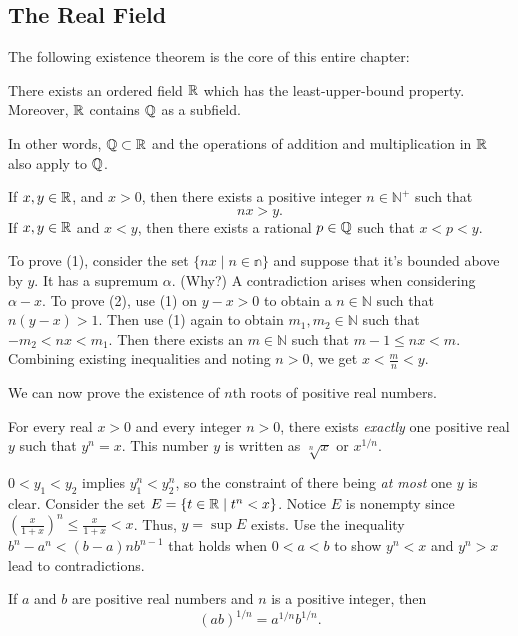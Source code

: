 \documentclass{article}
\begin{document}
\subsection{The Real Field}
The following existence theorem is the core of this entire chapter:
\begin{theorem}
    There exists an ordered field $\mathbb R$ which has the least-upper-bound property. Moreover, $\mathbb R$ contains $\mathbb Q$ as a subfield.
\end{theorem}
In other words, $\mathbb Q\subset \mathbb R$ and the operations of addition and multiplication in $\mathbb R$ also apply to $\mathbb Q$.
\begin{theorem}
    \listhack 
    \begin{enumerate}
        \ii If $x,y\in \mathbb R$, and $x>0$, then there exists a positive integer $n\in\mathbb{N}^{+}$ such that \[nx>y.\]
        \ii If $x,y\in\mathbb R$ and $x<y$, then there exists a rational $p\in\mathbb Q$ such that $x<p<y$.
    \end{enumerate}
\end{theorem}
\begin{remark}
    To prove (1), consider the set $\{nx\mid n\in\mathbb{n}\}$ and suppose that it's bounded above by $y$. It has a supremum $\alpha$. (Why?) A contradiction arises when considering $\alpha-x$. To prove (2), use (1) on $y-x>0$ to obtain a $n\in\mathbb{N}$ such that $n(y-x)>1$. Then use (1) again to obtain $m_{1},m_{2}\in\mathbb{N}$ such that $-m_{2}<nx<m_{1}$. Then there exists an $m\in\mathbb{N}$ such that $m-1\leq nx<m$. Combining existing inequalities and noting $n>0$, we get $x<\frac{m}{n}<y$.
\end{remark}
We can now prove the existence of $n$th roots of positive real numbers. 
\begin{theorem}
    For every real $x>0$ and every integer $n>0$, there exists \emph{exactly} one positive real $y$ such that $y^{n}=x$. This number $y$ is written as $\sqrt[n]{x}$ or $x^{1/n}$. 
\end{theorem}
\begin{remark}
    $0<y_{1}<y_{2}$ implies $y_{1}^{n}<y_{2}^{n}$, so the constraint of there being \textit{at most} one $y$ is clear. Consider the set  $E=\{t\in\mathbb R \mid t^{n}<x\}$. Notice $E$ is nonempty since $(\frac{x}{1+x})^{n}\leq \frac{x}{1+x}<x$. Thus, $y=\sup{E}$ exists. Use the inequality $b^{n}-a^{n}<(b-a)nb^{n-1}$ that holds when $0<a<b$ to show $y^{n}<x$ and $y^{n}>x$ lead to contradictions.
\end{remark}
\begin{corollary}
    If $a$ and $b$ are positive real numbers and $n$ is a positive integer, then \[(ab)^{1/n}=a^{1/n}b^{1/n}.\]
\end{corollary}
\end{document}
